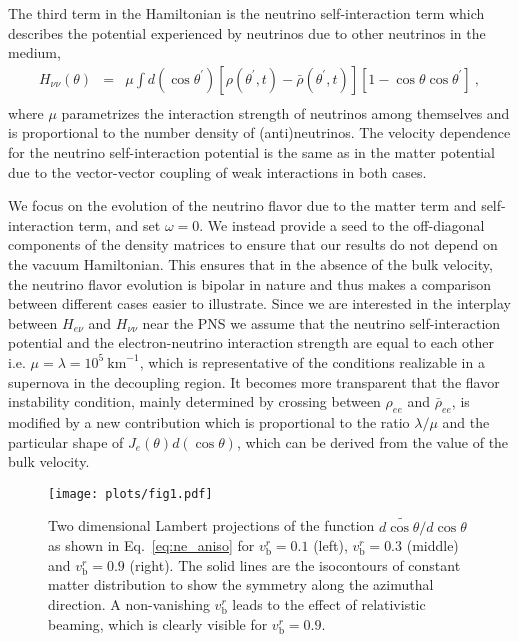 \documentclass[aps, prd, 10pt, twocolumn, superscriptaddress, noshowpacs, preprintnumbers, longbibliography, groupedaddress, footinbib, bibnotes]{revtex4-1}
\newcommand{\vbr}{v_{\mathrm{b}}^{r}}
\newcommand{\denp}{\rho(\theta^\prime,t)}
\newcommand{\denpbar}{\bar{\rho}(\theta^\prime,t)}
\begin{document}
The third term in the Hamiltonian is the neutrino self-interaction term which describes the potential experienced by neutrinos due to other neutrinos in the medium,
\begin{eqnarray}
\label{eq:Hnunu}
H_{\nu\nu}(\theta) &=& 
\mu \int d (\cos{\theta^\prime}) \left[\denp - \denpbar \right] \left[1 - \cos{\theta}\cos{\theta^{\prime}} \right] \ , \nonumber \\
& & 
\end{eqnarray}
where $\mu$ parametrizes the interaction strength of neutrinos among themselves and is proportional to the number density of (anti)neutrinos. The velocity dependence for the neutrino self-interaction potential is the same as in the matter potential due to the vector-vector coupling of weak interactions in both cases. 


We focus on the evolution of the neutrino flavor due to the matter term and self-interaction term, and set $\omega=0$. We instead provide a seed to the off-diagonal components of the density matrices to ensure that our results do not depend on the vacuum Hamiltonian. 
This ensures that in the absence of the bulk velocity, the neutrino flavor evolution is bipolar in nature and thus makes a comparison between different cases easier to illustrate. 
Since we are interested in the interplay between $H_{e\nu}$ and $H_{\nu\nu}$ near the PNS we assume that the neutrino self-interaction potential and the electron-neutrino interaction strength are equal to each other i.e. $\mu=\lambda=10^5 \ \mathrm{km}^{-1}$, which is representative of the conditions realizable in a supernova in the decoupling region. It becomes more transparent that the flavor instability condition, mainly determined by crossing between $\rho_{ee}$ and $\bar{\rho}_{ee}$, is modified by a new contribution which is proportional to the ratio $\lambda/\mu$ and the particular shape of $J_{e}(\theta)d(\cos{\theta})$, which can be derived from the value of the bulk velocity.

\begin{figure*}[t!]
\centering
\texttt{[image: plots/fig1.pdf]}
\caption{
Two dimensional Lambert projections of the function $ {d\widetilde{\cos{\theta}}}/{ d\cos{\theta} } $ as shown in Eq.~\ref{eq:ne_aniso} for $\vbr=0.1$ (left), $\vbr=0.3$ (middle) and $\vbr=0.9$ (right). The solid lines are the isocontours of constant matter distribution to show the symmetry along the azimuthal direction. A non-vanishing $\vbr$ leads to the effect of relativistic beaming, which is clearly visible for $\vbr=0.9$.
}
\label{fig:1pr}
\end{figure*}
\end{document}
